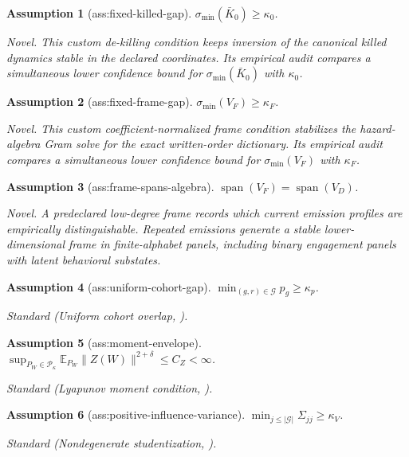 \documentclass{article}
\newtheorem{assumption}{Assumption}
\begin{document}
\begin{assumption}[ass:fixed-killed-gap]\label{ass:fixed-killed-gap}
\(\sigma_{\min}(\bar K_0)\ge\kappa_0\).
\par\smallskip\noindent\emph{Novel.} This custom de-killing condition keeps inversion of the canonical killed dynamics stable in the declared coordinates. Its empirical audit compares a simultaneous lower confidence bound for \(\sigma_{\min}(\bar K_0)\) with \(\kappa_0\).
\end{assumption}

\begin{assumption}[ass:fixed-frame-gap]\label{ass:fixed-frame-gap}
\(\sigma_{\min}(V_F)\ge\kappa_F\).
\par\smallskip\noindent\emph{Novel.} This custom coefficient-normalized frame condition stabilizes the hazard-algebra Gram solve for the exact written-order dictionary. Its empirical audit compares a simultaneous lower confidence bound for \(\sigma_{\min}(V_F)\) with \(\kappa_F\).
\end{assumption}

\begin{assumption}[ass:frame-spans-algebra]\label{ass:frame-spans-algebra}
\(\operatorname{span}(V_F)=\operatorname{span}(V_D)\).
\par\smallskip\noindent\emph{Novel.} A predeclared low-degree frame records which current emission profiles are empirically distinguishable. Repeated emissions generate a stable lower-dimensional frame in finite-alphabet panels, including binary engagement panels with latent behavioral substates.
\end{assumption}

\begin{assumption}[ass:uniform-cohort-gap]\label{ass:uniform-cohort-gap}
\(\min_{(g,r)\in\mathcal G}p_g\ge\kappa_p\).
\par\smallskip\noindent\emph{Standard} (Uniform cohort overlap, \cite{CallawaySantAnna2021DiD}).
\end{assumption}

\begin{assumption}[ass:moment-envelope]\label{ass:moment-envelope}
\(\sup_{P_W\in\mathcal P_{\kappa}}\mathbb E_{P_W}\|Z(W)\|^{2+\delta}\le C_Z<\infty\).
\par\smallskip\noindent\emph{Standard} (Lyapunov moment condition, \cite{VanDerVaart1998Asymptotic}).
\end{assumption}

\begin{assumption}[ass:positive-influence-variance]\label{ass:positive-influence-variance}
\(\min_{j\le |\mathcal G|}\Sigma_{jj}\ge\kappa_V\).
\par\smallskip\noindent\emph{Standard} (Nondegenerate studentization, \cite{CallawaySantAnna2021DiD}).
\end{assumption}
\end{document}
